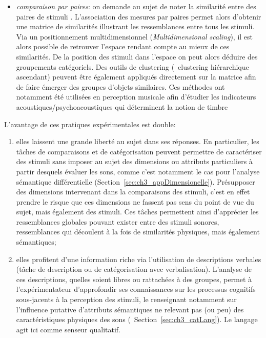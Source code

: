 \begin{itemize}
\item \emph{comparaison par paires}: on demande au sujet de noter la similarité entre des paires de stimuli \citep{gygi2007similarity}. L'association des mesures par paires permet alors d'obtenir une matrice de similarités illustrant les ressemblances entre tous les stimuli. Via un positionnement multidimensionnel (\emph{Multidimensional scaling}), il est alors possible de retrouver l'espace rendant compte au mieux de ces similarités. De la position des stimuli dans l'espace on peut alors déduire des groupements catégoriels. Des outils de clustering (\eg~clustering hiérarchique ascendant) peuvent être également appliqués directement sur la matrice afin de faire émerger des groupes d'objets similaires. Ces méthodes ont notamment été utilisées en perception musicale afin d'étudier les indicateurs acoustiques/psychoacoustiques qui déterminent la notion de timbre \citep{caclin2005acoustic}
\end{itemize}

L'avantage de ces pratiques expérimentales est double:

\begin{enumerate}

\item elles laissent une grande liberté au sujet dans ses réponses. En particulier, les tâches de comparaisons et de catégorisation peuvent permettre de caractériser des stimuli sans imposer au sujet des dimensions ou attributs particuliers à partir desquels évaluer les sons, comme c'est notamment le cas pour l'analyse sémantique différentielle (\cf Section~\ref{sec:ch3_appDimensionelle}). Présupposer des dimensions intervenant dans la comparaisons des stimuli, c'est en effet prendre le risque que ces dimensions ne fassent pas sens du point de vue du sujet, mais également des stimuli. Ces tâches permettent ainsi d'apprécier les ressemblances globales pouvant exister entre des stimuli sonores, ressemblances qui découlent à la fois de similarités physiques, mais également sémantiques;

\item elles profitent d'une information riche via l'utilisation de descriptions verbales (tâche de description ou de catégorisation avec verbalisation). L'analyse de ces descriptions, quelles soient libres ou rattachées à des groupes, permet à l'expérimentateur d’approfondir ses connaissances sur les processus cognitifs sous-jacents à la perception des stimuli, le renseignant notamment sur l'influence putative d'attributs sémantiques ne relevant pas (ou peu) des caractéristiques physiques des sons (\cf~Section~\ref{sec:ch3_catLang}). Le langage agit ici comme senseur qualitatif.

\end{enumerate}

